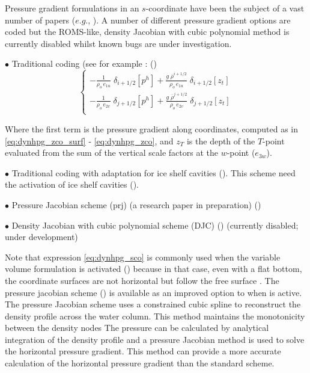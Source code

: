 \documentclass[../tex_main/NEMO_manual]{subfiles}
\begin{document}
Pressure gradient formulations in an $s$-coordinate have been the subject of a vast 
number of papers ($e.g.$, \citet{Song1998, Shchepetkin_McWilliams_OM05}). 
A number of different pressure gradient options are coded but the ROMS-like, density Jacobian with 
cubic polynomial method is currently disabled whilst known bugs are under investigation.

$\bullet$ Traditional coding (see for example \citet{Madec_al_JPO96}: ()
\begin{equation} \label{eq:dynhpg_sco}
\left\{ \begin{aligned}
 - \frac{1}    					{\rho_o \, e_{1u}} \;	\delta _{i+1/2} \left[  p^h  \right] 
+ \frac{g\; \overline {\rho}^{i+1/2}}	{\rho_o \, e_{1u}} \;	\delta _{i+1/2} \left[  z_t   \right]    \\
 - \frac{1}    					{\rho_o \, e_{2v}} \;	\delta _{j+1/2} \left[  p^h  \right]  
+ \frac{g\; \overline {\rho}^{j+1/2}}	{\rho_o \, e_{2v}} \;	\delta _{j+1/2} \left[  z_t   \right]    \\
\end{aligned} \right.
\end{equation} 

Where the first term is the pressure gradient along coordinates, computed as in 
\autoref{eq:dynhpg_zco_surf} - \autoref{eq:dynhpg_zco}, and $z_T$ is the depth of 
the $T$-point evaluated from the sum of the vertical scale factors at the $w$-point 
($e_{3w}$).
 
$\bullet$ Traditional coding with adaptation for ice shelf cavities ().
This scheme need the activation of ice shelf cavities ().

$\bullet$ Pressure Jacobian scheme (prj) (a research paper in preparation) ()

$\bullet$ Density Jacobian with cubic polynomial scheme (DJC) \citep{Shchepetkin_McWilliams_OM05} 
() (currently disabled; under development)

Note that expression \autoref{eq:dynhpg_sco} is commonly used when the variable volume formulation is
activated () because in that case, even with a flat bottom, the coordinate surfaces are not
horizontal but follow the free surface \citep{Levier2007}. The pressure jacobian scheme
() is available as an improved option to  when
 is active.  The pressure Jacobian scheme uses a constrained cubic spline to reconstruct
the density profile across the water column. This method maintains the monotonicity between the
density nodes  The pressure can be calculated by analytical integration of the density profile and a
pressure Jacobian method is used to solve the horizontal pressure gradient. This method can provide
a more accurate calculation of the horizontal pressure gradient than the standard scheme.
\end{document}
